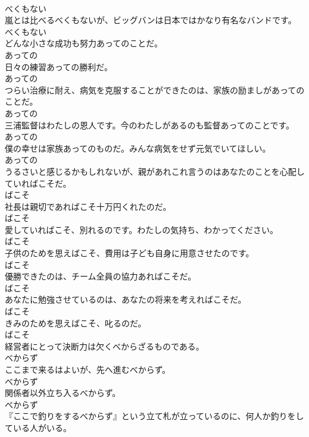 \documentclass[8pt]{extreport}
\begin{document}
\begin{CJK}{UTF8}{min}
\\	べくもない	
\\	嵐とは比べるべくもないが、ビッグバンは日本ではかなり有名なバンドです。	
\\	べくもない	
\\	どんな小さな成功も努力あってのことだ。	
\\	あっての	
\\	日々の練習あっての勝利だ。	
\\	あっての	
\\	つらい治療に耐え、病気を克服することができたのは、家族の励ましがあってのことだ。	
\\	あっての	
\\	三浦監督はわたしの恩人です。今のわたしがあるのも監督あってのことです。	
\\	あっての	
\\	僕の幸せは家族あってのものだ。みんな病気をせず元気でいてほしい。	
\\	あっての	
\\	うるさいと感じるかもしれないが、親があれこれ言うのはあなたのことを心配していればこそだ。	
\\	ばこそ	
\\	社長は親切であればこそ十万円くれたのだ。	
\\	ばこそ	
\\	愛していればこそ、別れるのです。わたしの気持ち、わかってください。	
\\	ばこそ	
\\	子供のためを思えばこそ、費用は子ども自身に用意させたのです。	
\\	ばこそ	
\\	優勝できたのは、チーム全員の協力あればこそだ。	
\\	ばこそ	
\\	あなたに勉強させているのは、あなたの将来を考えればこそだ。	
\\	ばこそ	
\\	きみのためを思えばこそ、叱るのだ。	
\\	ばこそ	
\\	経営者にとって決断力は欠くべからざるものである。	
\\	べからず	
\\	ここまで来るはよいが、先へ進むべからず。	
\\	べからず	
\\	関係者以外立ち入るべからず。	
\\	べからず	
\\	『ここで釣りをするべからず』という立て札が立っているのに、何人か釣りをしている人がいる。	

\end{CJK}
\end{document}

